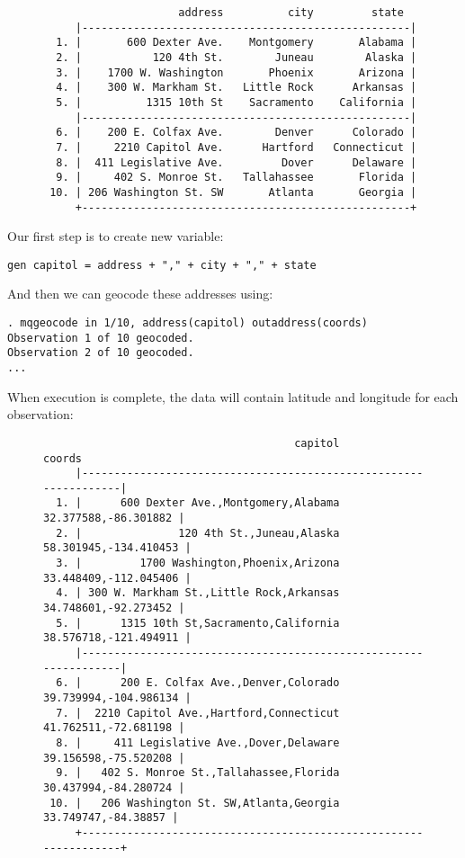 \documentclass[12pt]{article}
\begin{document}
\begin{figure}[ht]
\begin{center}
\begin{verbatim}
                     address          city         state 
     |---------------------------------------------------|
  1. |       600 Dexter Ave.    Montgomery       Alabama |
  2. |           120 4th St.        Juneau        Alaska |
  3. |    1700 W. Washington       Phoenix       Arizona |
  4. |    300 W. Markham St.   Little Rock      Arkansas |
  5. |          1315 10th St    Sacramento    California |
     |---------------------------------------------------|
  6. |    200 E. Colfax Ave.        Denver      Colorado |
  7. |     2210 Capitol Ave.      Hartford   Connecticut |
  8. |  411 Legislative Ave.         Dover      Delaware |
  9. |     402 S. Monroe St.   Tallahassee       Florida |
 10. | 206 Washington St. SW       Atlanta       Georgia |
     +---------------------------------------------------+
\end{verbatim}
\end{center}
\end{figure}

Our first step is to create new variable:
\begin{center}
\verb|gen capitol = address + "," + city + "," + state|
\end{center}

And then we can geocode these addresses using: 
\begin{verbatim}
. mqgeocode in 1/10, address(capitol) outaddress(coords)
Observation 1 of 10 geocoded.
Observation 2 of 10 geocoded.
...
\end{verbatim}
When execution is complete, the data will contain latitude and longitude for each observation:
\begin{figure}[ht]
\begin{verbatim}
                                       capitol                  coords 
     |-----------------------------------------------------------------|
  1. |      600 Dexter Ave.,Montgomery,Alabama    32.377588,-86.301882 |
  2. |               120 4th St.,Juneau,Alaska   58.301945,-134.410453 |
  3. |         1700 Washington,Phoenix,Arizona   33.448409,-112.045406 |
  4. | 300 W. Markham St.,Little Rock,Arkansas    34.748601,-92.273452 |
  5. |      1315 10th St,Sacramento,California   38.576718,-121.494911 |
     |-----------------------------------------------------------------|
  6. |      200 E. Colfax Ave.,Denver,Colorado   39.739994,-104.986134 |
  7. |  2210 Capitol Ave.,Hartford,Connecticut    41.762511,-72.681198 |
  8. |     411 Legislative Ave.,Dover,Delaware    39.156598,-75.520208 |
  9. |   402 S. Monroe St.,Tallahassee,Florida    30.437994,-84.280724 |
 10. |   206 Washington St. SW,Atlanta,Georgia     33.749747,-84.38857 |
     +-----------------------------------------------------------------+
\end{verbatim}
\end{figure}
\end{document}
